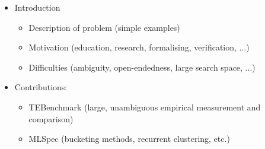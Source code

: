 \documentclass{article}
\begin{document}
\maketitle

\begin{itemize}
\item Introduction
  \begin{itemize}
  \item Description of problem (simple examples)
  \item Motivation (education, research, formalising, verification, ...)
  \item Difficulties (ambiguity, open-endedness, large search space, ...)
  \end{itemize}

\item Contributions:
  \begin{itemize}
  \item TEBenchmark (large, unambiguous empirical measurement and comparison)
  \item MLSpec (bucketing methods, recurrent clustering, etc.)
  \end{itemize}


\end{itemize}
\end{document}
